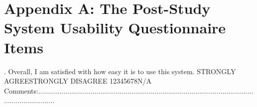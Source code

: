 \newpage
\newcommand{\tab}{\hspace*{4em}}
\appendix
\chapter{Appendix A: The Post-Study System Usability Questionnaire Items}
\newline
{}. Overall, I am satisfied with how easy it is to use this system.
\newline\newline
STRONGLY AGREE\tab\tab\tab\tab\tab STRONGLY DISAGREE
\newline\newline
\tab1\tab2\tab3\tab4\tab5\tab6\tab7\tab8\tab\tab N/A
\newline\newline
Comments:.........................................................................................................................................
\newline\newline

